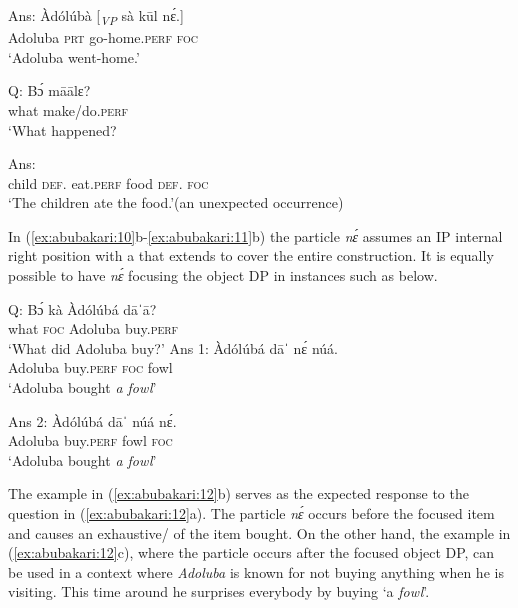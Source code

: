 \documentclass[output=paper
,newtxmath
,modfonts
,nonflat]{langsci/langscibook}
\begin{document}
\ex\label{ex:abubakari:10b}
Ans: \gll Àdólúbà  [\textit{\textsubscript{VP}	} sà  kūl      nɛ́.]\\
Adoluba {}   \textsc{prt}  go-home.\textsc{perf}   \textsc{foc}\\
\glt ‘Adoluba went-home.’
\z
\z
 
\ea\label{ex:abubakari:11}
\ea\label{ex:abubakari:11a}
Q: \gll Bɔ́  māālɛ? \\
what  make/do.\textsc{perf}\\                                            
\glt ‘What happened?   

\ex\label{ex:abubakari:11b}
Ans: \\
child   \textsc{def}.  eat.\textsc{perf}  food  \textsc{def}.  \textsc{foc}\\
\glt ‘The children ate the food.’(an unexpected occurrence)   
\z
\z

In (\ref{ex:abubakari:10}b-\ref{ex:abubakari:11}b) the particle \textit{nɛ́} assumes an IP internal right position with a  that extends to cover the entire construction. It is equally possible to have \textit{nɛ́} focusing the object DP in instances such as below.

 
\ea\label{ex:abubakari:12}
\ea\label{ex:abubakari:12a} 
Q: \gll Bɔ́  kà  Àdólúbá  dāˈā?\\
what  \textsc{foc}  Adoluba  buy.\textsc{perf}\\
\glt ‘What did Adoluba buy?’
\ex\label{ex:abubakari:12b} 
Ans 1: \gll Àdólúbá  dāˈ    nɛ́  núá.     \\
Adoluba   buy.\textsc{perf}  \textsc{foc}  fowl\\
\glt ‘Adoluba bought \textit{a fowl}’
 
\ex\label{ex:abubakari:12c} 
Ans 2: \gll Àdólúb\'{a}  dāˈ    núá  nɛ́.\\
Adoluba  buy.\textsc{perf}  fowl  \textsc{foc}\\
\glt ‘Adoluba bought \textit{a fowl}’
\z
\z
 
The example in (\ref{ex:abubakari:12}b) serves as the expected response to the question in (\ref{ex:abubakari:12}a). The particle \textit{nɛ́} occurs before the focused item and causes an exhaustive/ of the item bought. On the other hand, the example in (\ref{ex:abubakari:12}c), where the particle occurs after the focused object DP, can be used in a context where \textit{Adoluba} is known for not buying anything when he is visiting. This time around he surprises everybody by buying ‘a \textit{fowl}’. 
 
\end{document}
